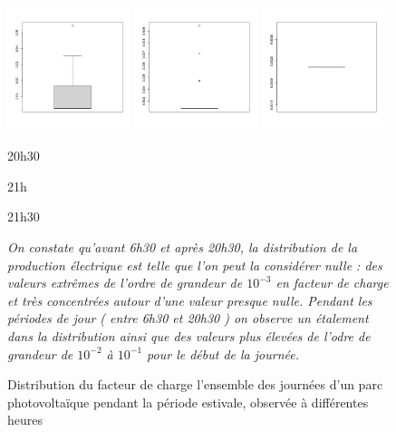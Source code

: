 \begin{figure}[H]
\begin{minipage}{\linewidth}
	\end{minipage}
	\begin{minipage}{\linewidth}
		\centering
		\includegraphics[width=0.32\textwidth]{Images/pv_pre/20:30:00.jpg}
		\includegraphics[width=0.32\textwidth]{Images/pv_pre/21:00:00.jpg}
		\includegraphics[width=0.32\textwidth]{Images/pv_pre/21:30:00.jpg}
	\end{minipage}
	\begin{minipage}{0.32\textwidth}
		\centering
		20h30
	\end{minipage}
	\begin{minipage}{0.32\textwidth}
		\centering
		21h
	\end{minipage}
	\begin{minipage}{0.32\textwidth}
		\centering
		21h30
	\end{minipage}
	\caption{Distribution du facteur de charge l'ensemble des journées d'un parc photovoltaïque pendant la période estivale, observée à différentes heures}
	\label{fig:boxplot_pv_journee}

	\smallskip

	\normalem

	\emph{On constate qu'avant 6h30 et après 20h30, la distribution de la production électrique est telle que l'on peut la considérer nulle : des valeurs extrêmes de l'ordre de grandeur de $10^{-3}$ en facteur de charge et très concentrées autour d'une valeur presque nulle. Pendant les périodes de jour ( entre 6h30 et 20h30 ) on observe un étalement dans la distribution ainsi que des valeurs plus élevées de l'odre de grandeur de $10^{-2}$ à $10^{-1}$ pour le début de la journée.}

\end{figure}
